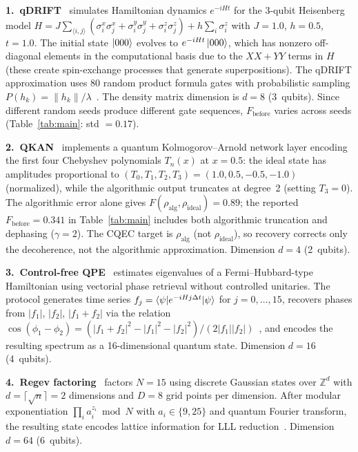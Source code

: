 \documentclass[prx,twocolumn,superscriptaddress,longbibliography,floatfix]{revtex4-2}
\begin{document}
\textbf{1.\ qDRIFT}~\cite{Campbell2019,Chen2021} simulates Hamiltonian dynamics $e^{-iHt}$ for the 3-qubit Heisenberg model $H = J \sum_{\langle i,j \rangle} (\sigma_i^x \sigma_j^x + \sigma_i^y \sigma_j^y + \sigma_i^z \sigma_j^z) + h \sum_i \sigma_i^z$ with $J = 1.0$, $h = 0.5$, $t = 1.0$.
The initial state $\ket{000}$ evolves to $e^{-iHt}\ket{000}$, which has nonzero off-diagonal elements in the computational basis due to the $XX + YY$ terms in $H$ (these create spin-exchange processes that generate superpositions).
The qDRIFT approximation uses 80 random product formula gates with probabilistic sampling $P(h_k) = \|h_k\| / \lambda$~\cite{Campbell2019}.
The density matrix dimension is $d = 8$ (3~qubits).
Since different random seeds produce different gate sequences, $F_\mathrm{before}$ varies across seeds (Table~\ref{tab:main}: std $= 0.17$).

\textbf{2.\ QKAN}~\cite{Ivashkov2024} implements a quantum Kolmogorov--Arnold network layer encoding the first four Chebyshev polynomials $T_n(x)$ at $x = 0.5$: the ideal state has amplitudes proportional to $(T_0, T_1, T_2, T_3) = (1.0, 0.5, -0.5, -1.0)$ (normalized), while the algorithmic output truncates at degree~2 (setting $T_3 = 0$).
The algorithmic error alone gives $F(\rho_\mathrm{alg}, \rho_\mathrm{ideal}) = 0.89$; the reported $F_\mathrm{before} = 0.341$ in Table~\ref{tab:main} includes both algorithmic truncation and dephasing ($\gamma = 2$).
The CQEC target is $\rho_\mathrm{alg}$ (not $\rho_\mathrm{ideal}$), so recovery corrects only the decoherence, not the algorithmic approximation.
Dimension $d = 4$ (2~qubits).

\textbf{3.\ Control-free QPE}~\cite{Clinton2026} estimates eigenvalues of a Fermi--Hubbard-type Hamiltonian using vectorial phase retrieval without controlled unitaries.
The protocol generates time series $f_j = \braket{\psi | e^{-iHj\Delta t} | \psi}$ for $j = 0, \ldots, 15$, recovers phases from $|f_1|$, $|f_2|$, $|f_1 + f_2|$ via the relation $\cos(\phi_1 - \phi_2) = (|f_1+f_2|^2 - |f_1|^2 - |f_2|^2) / (2|f_1||f_2|)$~\cite{Clinton2026}, and encodes the resulting spectrum as a 16-dimensional quantum state.
Dimension $d = 16$ (4~qubits).

\textbf{4.\ Regev factoring}~\cite{Regev2024} factors $N = 15$ using discrete Gaussian states over $\mathbb{Z}^d$ with $d = \lceil\sqrt{n}\rceil = 2$ dimensions and $D = 8$ grid points per dimension.
After modular exponentiation $\prod_i a_i^{z_i} \bmod N$ with $a_i \in \{9, 25\}$ and quantum Fourier transform, the resulting state encodes lattice information for LLL reduction~\cite{LLL1982}.
Dimension $d = 64$ (6~qubits).
\end{document}
